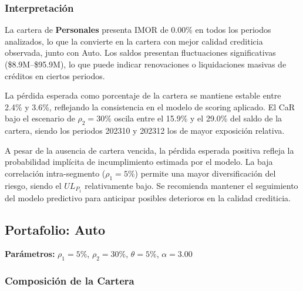 \subsubsection{Interpretación}

La cartera de \textbf{Personales} presenta IMOR de 0.00\% en todos los periodos analizados, lo que la convierte en la cartera con mejor calidad crediticia observada, junto con Auto. Los saldos presentan fluctuaciones significativas (\$8.9M--\$95.9M), lo que puede indicar renovaciones o liquidaciones masivas de créditos en ciertos periodos.

La pérdida esperada como porcentaje de la cartera se mantiene estable entre 2.4\% y 3.6\%, reflejando la consistencia en el modelo de scoring aplicado. El CaR bajo el escenario de $\rho_2 = 30\%$ oscila entre el 15.9\% y el 29.0\% del saldo de la cartera, siendo los periodos 202310 y 202312 los de mayor exposición relativa.

A pesar de la ausencia de cartera vencida, la pérdida esperada positiva refleja la probabilidad implícita de incumplimiento estimada por el modelo. La baja correlación intra-segmento ($\rho_1 = 5\%$) permite una mayor diversificación del riesgo, siendo el $UL_{P_1}$ relativamente bajo. Se recomienda mantener el seguimiento del modelo predictivo para anticipar posibles deterioros en la calidad crediticia.

\newpage

\subsection{Portafolio: Auto}

\textbf{Parámetros:} $\rho_1 = 5\%$, $\rho_2 = 30\%$, $\theta = 5\%$, $\alpha = 3.00$

\subsubsection{Composición de la Cartera}

